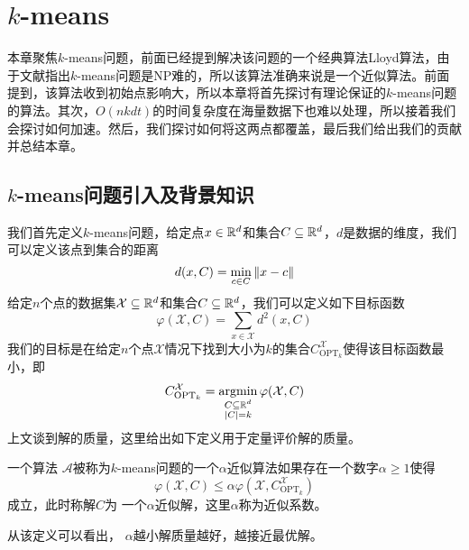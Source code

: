 \chapter{\texorpdfstring{$k$}{k}-means}
本章聚焦$k$-means问题，前面已经提到解决该问题的一个经典算法Lloyd算法，由于文献\cite{garey1982complexity,kleinberg1998microeconomic,mahajan2009planar}指出$k$-means问题是NP难的，所以该算法准确来说是一个近似算法。前面提到，该算法收到初始点影响大，所以本章将首先探讨有理论保证的$k$-means问题的算法。其次，$O(nkdt)$的时间复杂度在海量数据下也难以处理，所以接着我们会探讨如何加速。然后，我们探讨如何将这两点都覆盖，最后我们给出我们的贡献并总结本章。

\section{\texorpdfstring{$k$}{k}-means问题引入及背景知识}
我们首先定义$k$-means问题，给定点$x \in \mathbb{R}^d$和集合$C \subseteq \mathbb{R}^d$，$d$是数据的维度，我们可以定义该点到集合的距离
\begin{equation*}
d(x,C) = \min\limits_{c \in C}\left\lVert x - c\right\rVert
\end{equation*}
给定$n$个点的数据集$\mathcal{X} \subseteq \mathbb{R}^d$和集合$C \subseteq \mathbb{R}^d$，我们可以定义如下目标函数
\begin{equation*}
\varphi(\mathcal{X},C) = \sum_{x \in \mathcal{X}}d^2 (x,C)
\end{equation*}
我们的目标是在给定$n$个点$\mathcal{X}$情况下找到大小为$k$的集合$C_{\text{OPT}_k}^\mathcal{X}$使得该目标函数最小，即
\begin{equation*}
C_{\text{OPT}_k}^\mathcal{X} = \operatorname*{argmin}\limits_{ \substack{C \subseteq \mathbb{R}^d \\ |C| = k} }\varphi(\mathcal{X},C)
\end{equation*}
上文谈到解的质量，这里给出如下定义用于定量评价解的质量。
\begin{definition}[$k$-means问题解的质量]
    \label{def: k-means_quality}
    一个算法 $\mathcal{A}$被称为$k$-means问题的一个$\alpha$近似算法如果存在一个数字$\alpha \geq 1$使得
    \begin{equation*}
        \varphi(\mathcal{X},C) \leq \alpha \varphi(\mathcal{X},C_{\text{OPT}_k}^{\mathcal{X}})
    \end{equation*}
    成立，此时称解$C$为
一个$\alpha$近似解，这里$\alpha$称为近似系数。
\end{definition}
从该定义可以看出， $\alpha$越小解质量越好，越接近最优解。